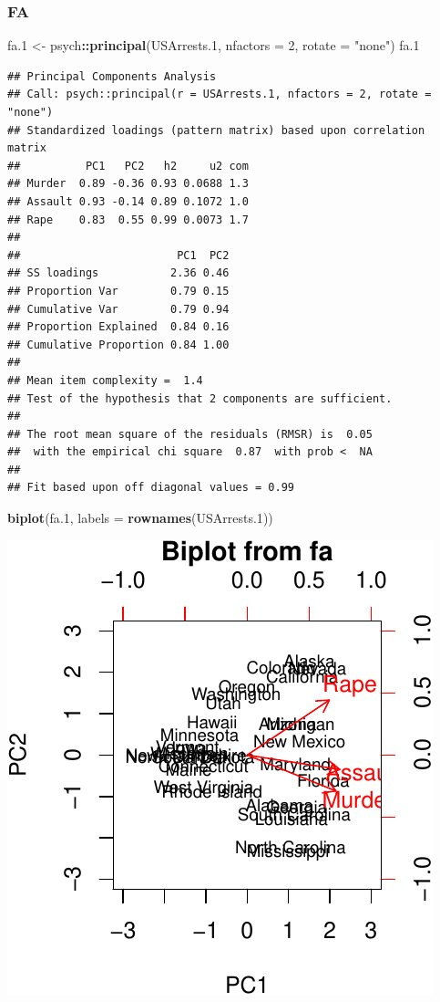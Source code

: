 \documentclass[]{book}
\newenvironment{Shaded}{\begin{snugshade}}{\end{snugshade}}
\newcommand{\DataTypeTok}[1]{\textcolor[rgb]{0.13,0.29,0.53}{#1}}
\newcommand{\DecValTok}[1]{\textcolor[rgb]{0.00,0.00,0.81}{#1}}
\newcommand{\FloatTok}[1]{\textcolor[rgb]{0.00,0.00,0.81}{#1}}
\newcommand{\KeywordTok}[1]{\textcolor[rgb]{0.13,0.29,0.53}{\textbf{#1}}}
\newcommand{\NormalTok}[1]{#1}
\newcommand{\OperatorTok}[1]{\textcolor[rgb]{0.81,0.36,0.00}{\textbf{#1}}}
\newcommand{\StringTok}[1]{\textcolor[rgb]{0.31,0.60,0.02}{#1}}
\theoremstyle{definition}
\theoremstyle{definition}
\theoremstyle{definition}
\theoremstyle{remark}
\begin{document}
\hypertarget{fa}{%
\subsubsection{FA}\label{fa}}

\begin{Shaded}
\begin{Highlighting}[]
\NormalTok{fa}\FloatTok{.1}\NormalTok{ <-}\StringTok{ }\NormalTok{psych}\OperatorTok{::}\KeywordTok{principal}\NormalTok{(USArrests}\FloatTok{.1}\NormalTok{, }\DataTypeTok{nfactors =} \DecValTok{2}\NormalTok{, }\DataTypeTok{rotate =} \StringTok{"none"}\NormalTok{)}
\NormalTok{fa}\FloatTok{.1}
\end{Highlighting}
\end{Shaded}

\begin{verbatim}
## Principal Components Analysis
## Call: psych::principal(r = USArrests.1, nfactors = 2, rotate = "none")
## Standardized loadings (pattern matrix) based upon correlation matrix
##          PC1   PC2   h2     u2 com
## Murder  0.89 -0.36 0.93 0.0688 1.3
## Assault 0.93 -0.14 0.89 0.1072 1.0
## Rape    0.83  0.55 0.99 0.0073 1.7
## 
##                        PC1  PC2
## SS loadings           2.36 0.46
## Proportion Var        0.79 0.15
## Cumulative Var        0.79 0.94
## Proportion Explained  0.84 0.16
## Cumulative Proportion 0.84 1.00
## 
## Mean item complexity =  1.4
## Test of the hypothesis that 2 components are sufficient.
## 
## The root mean square of the residuals (RMSR) is  0.05 
##  with the empirical chi square  0.87  with prob <  NA 
## 
## Fit based upon off diagonal values = 0.99
\end{verbatim}

\begin{Shaded}
\begin{Highlighting}[]
\KeywordTok{biplot}\NormalTok{(fa}\FloatTok{.1}\NormalTok{, }\DataTypeTok{labels =}  \KeywordTok{rownames}\NormalTok{(USArrests}\FloatTok{.1}\NormalTok{)) }
\end{Highlighting}
\end{Shaded}

\includegraphics[width=0.5\linewidth]{Rcourse_files/figure-latex/FA-1}
\end{document}
